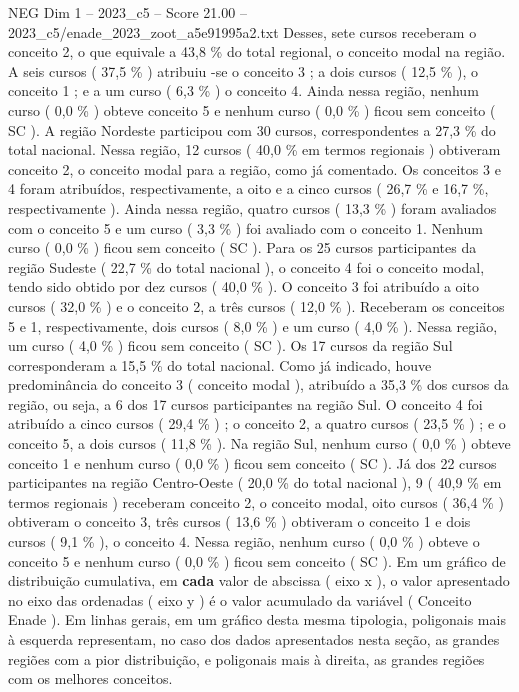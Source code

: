 \begin{textsample}{NEG Dim 1 – 2023\_c5 – Score 21.00 – 2023\_c5/enade\_2023\_zoot\_a5e91995a2.txt}
Desses, sete cursos receberam o conceito 2, o que equivale a 43,8 \% do total regional, o conceito modal na região.
A seis cursos ( 37,5 \% ) atribuiu -se o conceito 3 ; a dois cursos ( 12,5 \% ), o conceito 1 ; e a um curso ( 6,3 \% ) o conceito 4.
Ainda nessa região, nenhum curso ( 0,0 \% ) obteve conceito 5 e nenhum curso ( 0,0 \% ) ficou sem conceito ( SC ).
A região Nordeste participou com 30 cursos, correspondentes a 27,3 \% do total nacional.
Nessa região, 12 cursos ( 40,0 \% em termos regionais ) obtiveram conceito 2, o conceito modal para a região, como já comentado.
Os conceitos 3 e 4 foram atribuídos, respectivamente, a oito e a cinco cursos ( 26,7 \% e 16,7 \%, respectivamente ).
Ainda nessa região, quatro cursos ( 13,3 \% ) foram avaliados com o conceito 5 e um curso ( 3,3 \% ) foi avaliado com o conceito 1.
Nenhum curso ( 0,0 \% ) ficou sem conceito ( SC ).
Para os 25 cursos participantes da região Sudeste ( 22,7 \% do total nacional ), o conceito 4 foi o conceito modal, tendo sido obtido por dez cursos ( 40,0 \% ).
O conceito 3 foi atribuído a oito cursos ( 32,0 \% ) e o conceito 2, a três cursos ( 12,0 \% ).
Receberam os conceitos 5 e 1, respectivamente, dois cursos ( 8,0 \% ) e um curso ( 4,0 \% ).
Nessa região, um curso ( 4,0 \% ) ficou sem conceito ( SC ).
Os 17 cursos da região Sul corresponderam a 15,5 \% do total nacional.
Como já indicado, houve predominância do conceito 3 ( conceito modal ), atribuído a 35,3 \% dos cursos da região, ou seja, a 6 dos 17 cursos participantes na região Sul.
O conceito 4 foi atribuído a cinco cursos ( 29,4 \% ) ; o conceito 2, a quatro cursos ( 23,5 \% ) ; e o conceito 5, a dois cursos ( 11,8 \% ).
Na região Sul, nenhum curso ( 0,0 \% ) obteve conceito 1 e nenhum curso ( 0,0 \% ) ficou sem conceito ( SC ).
Já dos 22 cursos participantes na região Centro-Oeste ( 20,0 \% do total nacional ), 9 ( 40,9 \% em termos regionais ) receberam conceito 2, o conceito modal, oito cursos ( 36,4 \% ) obtiveram o conceito 3, três cursos ( 13,6 \% ) obtiveram o conceito 1 e dois cursos ( 9,1 \% ), o conceito 4.
Nessa região, nenhum curso ( 0,0 \% ) obteve o conceito 5 e nenhum curso ( 0,0 \% ) ficou sem conceito ( SC ).
Em um gráfico de distribuição cumulativa, em \textbf{cada} valor de abscissa ( eixo x ), o valor apresentado no eixo das ordenadas ( eixo y ) é o valor acumulado da variável ( Conceito Enade ).
Em linhas gerais, em um gráfico desta mesma tipologia, poligonais mais à esquerda representam, no caso dos dados apresentados nesta seção, as grandes regiões com a pior distribuição, e poligonais mais à direita, as grandes regiões com os melhores conceitos.

\end{textsample}
